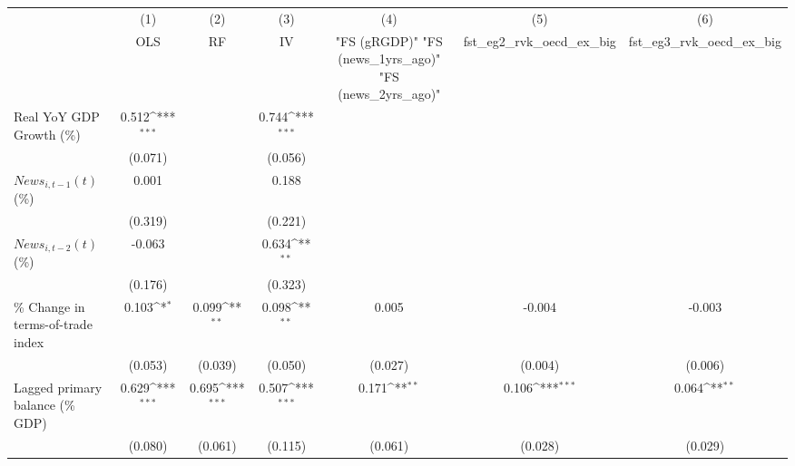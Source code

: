 {
\def\sym#1{\ifmmode^{#1}\else\(^{#1}\)\fi}
\begin{tabular}{l*{6}{c}}
\toprule
                    &\multicolumn{1}{c}{(1)}&\multicolumn{1}{c}{(2)}&\multicolumn{1}{c}{(3)}&\multicolumn{1}{c}{(4)}&\multicolumn{1}{c}{(5)}&\multicolumn{1}{c}{(6)}\\
                    &\multicolumn{1}{c}{OLS}&\multicolumn{1}{c}{RF}&\multicolumn{1}{c}{IV}&\multicolumn{1}{c}{ "FS (gRGDP)"  "FS (news_1yrs_ago)"  "FS (news_2yrs_ago)" }&\multicolumn{1}{c}{fst_eg2_rvk_oecd_ex_big}&\multicolumn{1}{c}{fst_eg3_rvk_oecd_ex_big}\\
\midrule
Real YoY GDP Growth (\%)&       0.512\sym{***}&                     &       0.744\sym{***}&                     &                     &                     \\
                    &     (0.071)         &                     &     (0.056)         &                     &                     &                     \\
\addlinespace
$ News_{i,t-1}(t)$ (\%)&       0.001         &                     &       0.188         &                     &                     &                     \\
                    &     (0.319)         &                     &     (0.221)         &                     &                     &                     \\
\addlinespace
$ News_{i,t-2}(t)$ (\%)&      -0.063         &                     &       0.634\sym{**} &                     &                     &                     \\
                    &     (0.176)         &                     &     (0.323)         &                     &                     &                     \\
\addlinespace
\% Change in terms-of-trade index&       0.103\sym{*}  &       0.099\sym{**} &       0.098\sym{**} &       0.005         &      -0.004         &      -0.003         \\
                    &     (0.053)         &     (0.039)         &     (0.050)         &     (0.027)         &     (0.004)         &     (0.006)         \\
\addlinespace
Lagged primary balance (\% GDP)&       0.629\sym{***}&       0.695\sym{***}&       0.507\sym{***}&       0.171\sym{**} &       0.106\sym{***}&       0.064\sym{**} \\
                    &     (0.080)         &     (0.061)         &     (0.115)         &     (0.061)         &     (0.028)         &     (0.029)         \\

\end{tabular}}
